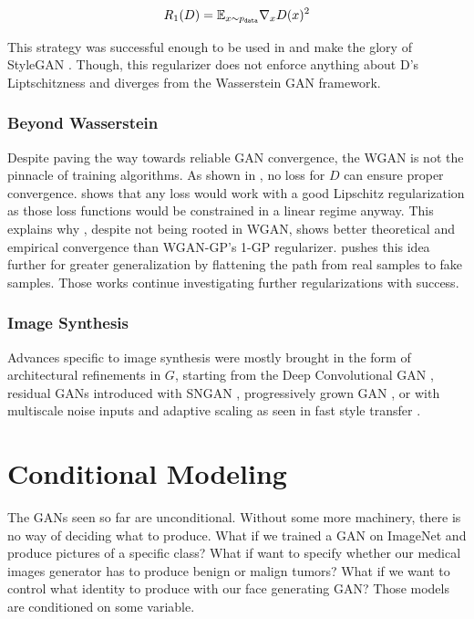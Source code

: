 \begin{equation}
    R_1(D) = \mathbb{E}_{x \sim p_\texttt{data}} \nabla_x D(x)^2
\end{equation}

This strategy was successful enough to be used in and make the glory of StyleGAN \citep{stylegan}. Though, this regularizer does not enforce anything about D's Liptschitzness and diverges from the Wasserstein GAN framework.

\subsubsection{Beyond Wasserstein}

Despite paving the way towards reliable \ac{GAN} convergence, the \ac{WGAN} is not the pinnacle of training algorithms. As shown in \citet{aregansequal}, no loss for $D$ can ensure proper convergence. \citet{lipschitzgan} shows that any loss would work with a good Lipschitz regularization as those loss functions would be constrained in a linear regime anyway. This explains why \citet{R1}, despite not being rooted in \ac{WGAN}, shows better theoretical and empirical convergence than \ac{WGAN-GP}'s 1-GP regularizer. \citet{0-GP} pushes this idea further for greater generalization by flattening the path from real samples to fake samples. Those works continue investigating further regularizations with success.

\subsubsection{Image Synthesis}

Advances specific to image synthesis were mostly brought in the form of architectural refinements in $G$, starting from the Deep Convolutional \ac{GAN} \citep{dcgan}, residual \acp{GAN} introduced with \ac{SNGAN} \citep{SNGAN}, progressively grown \ac{GAN} \citep{progan}, or with multiscale noise inputs and adaptive scaling \citep{spade,stylegan,stylegan2} as seen in fast style transfer \citep{faststyletransfer}.

\section{Conditional Modeling}

The \acp{GAN} seen so far are unconditional. Without some more machinery, there is no way of deciding what to produce. What if we trained a \ac{GAN} on ImageNet and produce pictures of a specific class? What if want to specify whether our medical images generator has to produce benign or malign tumors? What if we want to control what identity to produce with our face generating \ac{GAN}? Those models are conditioned on some variable.

